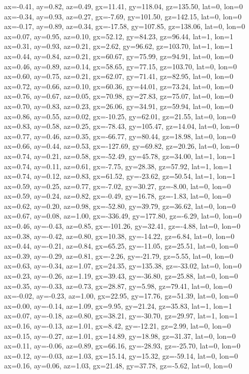 ax=-0.41, ay=0.82, az=0.49, gx=11.41, gy=118.04, gz=135.50, lat=0, lon=0
ax=-0.34, ay=0.93, az=0.27, gx=-7.69, gy=101.50, gz=142.15, lat=0, lon=0
ax=-0.17, ay=0.89, az=0.34, gx=-17.58, gy=107.85, gz=138.06, lat=0, lon=0
ax=0.07, ay=0.95, az=0.10, gx=52.12, gy=84.23, gz=96.44, lat=1, lon=1
ax=0.31, ay=0.93, az=0.21, gx=2.62, gy=96.62, gz=103.70, lat=1, lon=1
ax=0.44, ay=0.84, az=0.21, gx=60.67, gy=75.99, gz=94.91, lat=0, lon=0
ax=0.46, ay=0.89, az=0.14, gx=58.65, gy=77.15, gz=103.70, lat=0, lon=0
ax=0.60, ay=0.75, az=0.21, gx=62.07, gy=71.41, gz=82.95, lat=0, lon=0
ax=0.72, ay=0.66, az=0.10, gx=60.36, gy=44.01, gz=73.24, lat=0, lon=0
ax=0.76, ay=0.67, az=0.05, gx=70.98, gy=27.83, gz=75.07, lat=0, lon=0
ax=0.70, ay=0.83, az=0.23, gx=26.06, gy=34.91, gz=59.94, lat=0, lon=0
ax=0.86, ay=0.55, az=0.02, gx=-10.25, gy=62.01, gz=21.55, lat=0, lon=0
ax=0.83, ay=0.58, az=0.25, gx=-78.43, gy=105.47, gz=14.04, lat=0, lon=0
ax=0.77, ay=0.46, az=0.35, gx=-66.77, gy=80.44, gz=18.98, lat=0, lon=0
ax=0.66, ay=0.44, az=0.53, gx=-127.69, gy=69.82, gz=20.26, lat=0, lon=0
ax=0.74, ay=0.21, az=0.58, gx=-52.49, gy=45.78, gz=34.00, lat=1, lon=1
ax=0.74, ay=0.11, az=0.61, gx=-7.75, gy=28.38, gz=57.92, lat=1, lon=1
ax=0.74, ay=0.12, az=0.83, gx=61.52, gy=-23.62, gz=50.54, lat=1, lon=1
ax=0.59, ay=0.25, az=0.77, gx=-7.02, gy=30.27, gz=-8.00, lat=0, lon=0
ax=0.59, ay=0.24, az=0.82, gx=-0.49, gy=16.78, gz=-1.83, lat=0, lon=0
ax=0.62, ay=0.20, az=0.98, gx=-52.80, gy=39.79, gz=36.62, lat=0, lon=0
ax=0.67, ay=0.08, az=1.00, gx=-336.49, gy=177.80, gz=-6.29, lat=0, lon=0
ax=0.46, ay=-0.43, az=0.85, gx=-101.26, gy=32.41, gz=-4.88, lat=0, lon=0
ax=0.38, ay=-0.42, az=0.80, gx=10.38, gy=-14.22, gz=6.84, lat=0, lon=0
ax=0.44, ay=-0.21, az=0.84, gx=65.25, gy=-11.05, gz=25.51, lat=0, lon=0
ax=0.39, ay=-0.29, az=0.81, gx=-2.26, gy=-21.79, gz=5.55, lat=0, lon=0
ax=0.63, ay=-0.34, az=1.07, gx=24.35, gy=135.38, gz=-33.02, lat=0, lon=0
ax=0.23, ay=-0.26, az=1.19, gx=39.43, gy=-36.80, gz=25.88, lat=0, lon=0
ax=0.35, ay=-0.33, az=0.73, gx=28.87, gy=5.98, gz=79.41, lat=0, lon=0
ax=-0.02, ay=-0.23, az=1.00, gx=22.95, gy=17.76, gz=51.39, lat=0, lon=0
ax=0.00, ay=-0.14, az=1.09, gx=9.95, gy=21.24, gz=35.83, lat=1, lon=1
ax=0.07, ay=-0.18, az=0.80, gx=38.21, gy=-30.70, gz=29.97, lat=1, lon=1
ax=0.16, ay=-0.13, az=1.01, gx=8.42, gy=-12.21, gz=2.99, lat=0, lon=0
ax=0.15, ay=-0.27, az=1.01, gx=14.89, gy=18.98, gz=31.37, lat=0, lon=0
ax=0.11, ay=-0.06, az=0.89, gx=66.16, gy=-28.93, gz=-25.70, lat=0, lon=0
ax=0.12, ay=-0.03, az=1.03, gx=15.14, gy=15.32, gz=-59.14, lat=0, lon=0
ax=0.16, ay=0.06, az=1.03, gx=21.48, gy=37.78, gz=-5.62, lat=0, lon=0
